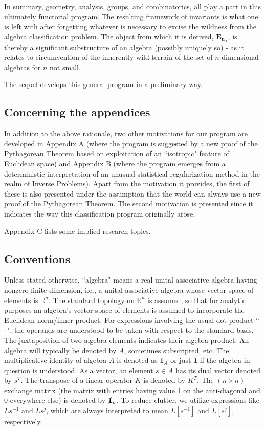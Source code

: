 \documentclass{amsart}
\numberwithin{equation}{section}
\theoremstyle{definition}
\numberwithin{theorem}{section}
\begin{document}
 
In summary, geometry, analysis, groups, and combinatorics, all play a part in this ultimately functorial program.  The resulting framework of invariants is what one is left with after forgetting whatever is necessary to excise the wildness from the algebra classification problem.  The object from which it is derived, $\mathbf{E}_{\mathbf{u}_A}$, is thereby a significant substructure of an algebra (possibly uniquely so) - as it relates to circumvention of the inherently wild terrain of the set of $n$-dimensional algebras for $n$ not small.  
  
The sequel develops this general program in a preliminary way.

  \subsection{Concerning the appendices}  In addition to the above rationale, two other motivations for our program are developed in Appendix A (where the program is suggested by a new proof of the Pythagorean Theorem based on exploitation of an ``isotropic" feature of Euclidean space) and Appendix B (where the program emerges from a deterministic interpretation of an unusual statistical regularization method in the realm of Inverse Problems).   Apart from the motivation it provides, the first of these is also presented under the assumption that the world \enlargethispage{1.5cm} can always use a new proof of the Pythagorean Theorem.  The second motivation is presented since it indicates the way this classification program  originally arose.

 Appendix C lists some implied research topics. 
 
 
 \subsection{Conventions}   Unless stated otherwise, ``algebra" means a real unital associative algebra having nonzero finite dimension, i.e., a unital associative algebra whose vector space of elements is $\mathbb{R}^n$. The standard topology on $\mathbb{R}^n$ is assumed, so that for analytic purposes an algebra's vector space of elements is assumed to incorporate the Euclidean norm/inner product.  For expressions involving the usual dot product ``\,$\cdot$\,", the operands are understood to be taken with respect to the standard basis. The juxtaposition of two algebra elements indicates their algebra product.  An algebra will typically be denoted by $A$, sometimes subscripted, etc. The multiplicative identity of algebra $A$ is denoted as $\mathbf{1}_A$ or just $\mathbf{1}$ if the algebra in question is understood.   As a vector, an element $s\in A$ has its dual vector denoted by $s^T$.  The transpose of a linear operator $K$ is denoted by $K^T$.  The $(n\times n)$-exchange matrix (the matrix with entries having value 1 on the anti-diagonal and 0 everywhere else) is denoted by  $\slashed{\bf 1}_n$.   To reduce clutter, we utilize  expressions like $Ls^{-1}$ and $Ls^j$, which are always interpreted to mean $L[s^{-1}]$ and $L[s^j]$, respectively.  
 
\end{document}
